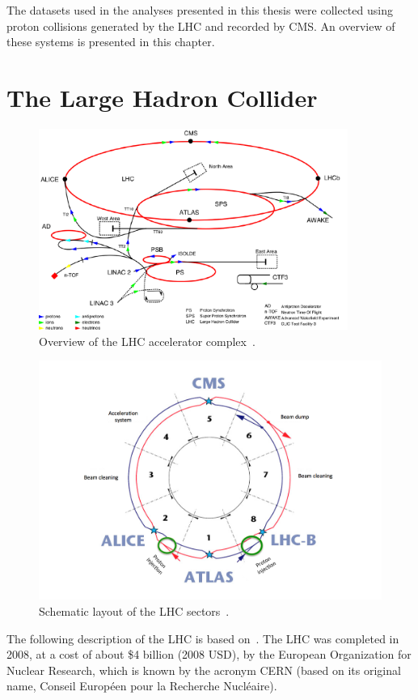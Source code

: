 The datasets used in the analyses presented in this thesis were collected using
proton collisions generated by the LHC and recorded by CMS. An overview of these
systems is presented in this chapter.

\section{The Large Hadron Collider}
\label{sec:LHC}
\begin{figure}[tb]
  \centering
  \includegraphics[width=0.9\textwidth]{figures/cerncomplex}
  \caption[Overview of the LHC accelerator complex]{Overview of the LHC accelerator complex~\cite{cerncomplex}.}
  \label{fig:cerncomplex}
\end{figure}
\begin{figure}[tb]
  \centering
  \includegraphics[width=\textwidth]{figures/lhc_schematic}
  \caption[Schematic layout of the LHC sectors]{Schematic layout of the LHC sectors~\cite{lhc_schematic}.}
  \label{fig:lhc_schematic}
\end{figure}
The following description of the LHC is based on~\cite{bluebook}. The LHC was
completed in 2008, at a cost of about \$4 billion (2008 USD), by the European
Organization for Nuclear Research, which is known by the acronym CERN (based on
its original name, Conseil Européen pour la Recherche Nucléaire).

